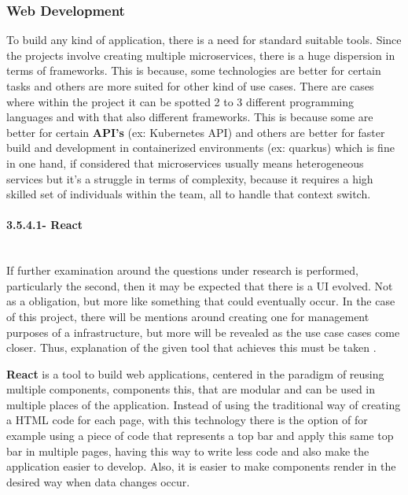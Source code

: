 \subsubsection{Web Development}
To build any kind of application, there is a need for standard suitable tools. Since the projects involve creating multiple microservices, 
there is a huge dispersion in terms of frameworks. This is because, some technologies are better for certain tasks and others are more suited
for other kind of use cases. There are cases where within the project it can be spotted 2 to 3 different programming languages and with 
that also different frameworks. This is because some are better for certain \textbf{API's} (ex: Kubernetes API) and others are better for 
faster build and development in containerized environments (ex: quarkus) which is fine in one hand, if considered that microservices 
usually means heterogeneous services but it's a struggle in terms of complexity, because it requires a high skilled set of individuals 
within the team, all to handle that context switch. 

\paragraph{3.5.4.1- React}\mbox{}\\
If further examination around the questions under research is performed, particularly the second, then it may be expected 
that there is a UI evolved. Not as a obligation, but more like something that could eventually occur. In the case of this project, 
there will be mentions around creating one for management purposes of a infrastructure, but more will be revealed as the use case cases 
come closer. Thus, explanation of the given tool that achieves this must be taken \cite{react}.

\textbf{React} is a tool to build web applications, centered in the paradigm of reusing multiple components, components this, 
that are modular and can be used in multiple places of the application. Instead of using the traditional way of creating a HTML 
code for each page, with this technology there is the option of for example using a piece of code that represents a top bar and 
apply this same top bar in multiple pages, having this way to write less code and also make the application easier to develop. Also, 
it is easier to make components render in the desired way when data changes occur. 

